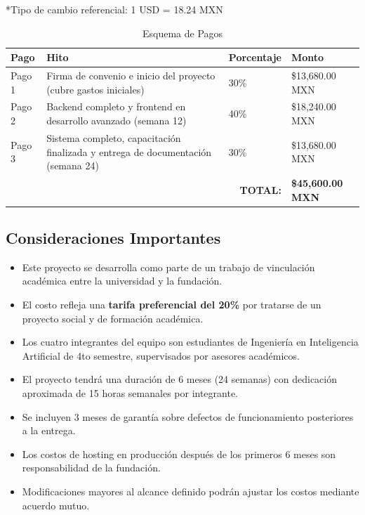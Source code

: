 \documentclass[12pt,letterpaper]{article}
\begin{document}
\vspace{0.5cm}
\noindent
\small{*Tipo de cambio referencial: 1 USD = 18.24 MXN}


\begin{table}[h]
\centering
\caption{Esquema de Pagos}
\label{tab:pagos}
\begin{tabular}{|p{1.5cm}|p{7cm}|p{2.5cm}|p{3cm}|}
\hline
\textbf{Pago} & \textbf{Hito} & \textbf{Porcentaje} & \textbf{Monto} \\
\hline
\hline
Pago 1 & Firma de convenio e inicio del proyecto (cubre gastos iniciales) & 30\% & \$13,680.00 MXN \\
\hline
Pago 2 & Backend completo y frontend en desarrollo avanzado (semana 12) & 40\% & \$18,240.00 MXN \\
\hline
Pago 3 & Sistema completo, capacitación finalizada y entrega de documentación (semana 24) & 30\% & \$13,680.00 MXN \\
\hline
\hline
\multicolumn{3}{|r|}{\textbf{TOTAL:}} & \textbf{\$45,600.00 MXN} \\
\hline
\end{tabular}
\end{table}

\subsection{Consideraciones Importantes}

\begin{itemize}
    \item Este proyecto se desarrolla como parte de un trabajo de vinculación académica entre la universidad y la fundación.
    
    \item El costo refleja una \textbf{tarifa preferencial del 20\%} por tratarse de un proyecto social y de formación académica.
    
    \item Los cuatro integrantes del equipo son estudiantes de Ingeniería en Inteligencia Artificial de 4to semestre, supervisados por asesores académicos.
    
    \item El proyecto tendrá una duración de 6 meses (24 semanas) con dedicación aproximada de 15 horas semanales por integrante.
    
    \item Se incluyen 3 meses de garantía sobre defectos de funcionamiento posteriores a la entrega.
    
    \item Los costos de hosting en producción después de los primeros 6 meses son responsabilidad de la fundación.
    
    \item Modificaciones mayores al alcance definido podrán ajustar los costos mediante acuerdo mutuo.
\end{itemize}
\end{document}
